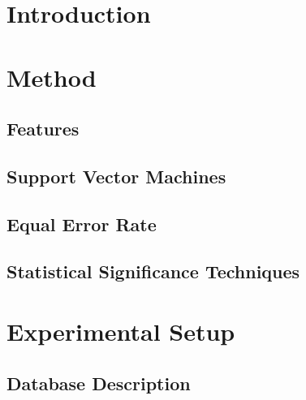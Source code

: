 \documentclass[11pt,a4paper]{tesis}
\begin{document}
\linespread{1.6}
  \def\titulo{Licenciado }

  \def\autor{Leandro Ariel Matayoshi}
  \def\tituloTesis{Pronunciation Scoring at Phone Level for Second Language Learning}
  \def\runtitulo{Pronunciation Scoring at Phone Level for Second Language Learning}
  \def\runtitle{Pronunciation Scoring at Phone Level for Second Language Learning}
  \def\director{Dra. Luciana Ferrer}
  \def\lugar{Buenos Aires, Octubre 2018}
	

	\tableofcontents
	\chapter{Introduction}
		
		
	\chapter{Method}
		
		\section{Features}
			
			
			
		\section{Support Vector Machines}
			
		\section{Equal Error Rate}
			
		\section{Statistical Significance Techniques}
			
			

	\chapter{Experimental Setup}
		
		\section{Database Description}
			
\end{document}
